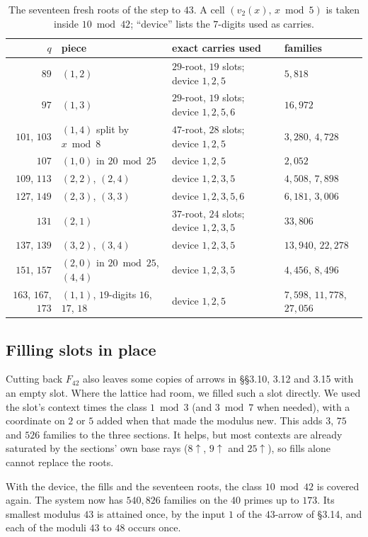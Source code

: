 \documentclass[11pt]{amsart}
\theoremstyle{definition}
\theoremstyle{remark}
\newcommand{\up}{{\uparrow}}
\begin{document}
\begin{table}[ht]
\centering
\caption{The seventeen fresh roots of the step to $43$. A cell $(v_2(x),\,x \bmod 5)$ is taken inside
$10 \bmod 42$; ``device'' lists the $7$-digits used as carries.}\label{tab:roots}
\small
\begin{tabular}{@{}rlll@{}}
\toprule
$q$ & piece & exact carries used & families\\
\midrule
$89$ & $(1,2)$ & $29$-root, $19$ slots; device $1,2,5$ & $5{,}818$\\
$97$ & $(1,3)$ & $29$-root, $19$ slots; device $1,2,5,6$ & $16{,}972$\\
$101$, $103$ & $(1,4)$ split by $x \bmod 8$ & $47$-root, $28$ slots; device $1,2,5$ & $3{,}280$, $4{,}728$\\
$107$ & $(1,0)$ in $20 \bmod 25$ & device $1,2,5$ & $2{,}052$\\
$109$, $113$ & $(2,2)$, $(2,4)$ & device $1,2,3,5$ & $4{,}508$, $7{,}898$\\
$127$, $149$ & $(2,3)$, $(3,3)$ & device $1,2,3,5,6$ & $6{,}181$, $3{,}006$\\
$131$ & $(2,1)$ & $37$-root, $24$ slots; device $1,2,3,5$ & $33{,}806$\\
$137$, $139$ & $(3,2)$, $(3,4)$ & device $1,2,3,5$ & $13{,}940$, $22{,}278$\\
$151$, $157$ & $(2,0)$ in $20 \bmod 25$, $(4,4)$ & device $1,2,3,5$ & $4{,}456$, $8{,}496$\\
$163$, $167$, $173$ & $(1,1)$, $19$-digits $16$, $17$, $18$ & device $1,2,5$ & $7{,}598$, $11{,}778$, $27{,}056$\\
\bottomrule
\end{tabular}
\end{table}

\subsection*{Filling slots in place}
Cutting back $F_{42}$ also leaves some copies of arrows in §§3.10, 3.12 and 3.15 with an empty slot. Where the lattice
had room, we filled such a slot directly. We used the slot's context times the class $1 \bmod 3$ (and $3 \bmod 7$ when
needed), with a coordinate on $2$ or $5$ added when that made the modulus new. This adds $3$, $75$ and $526$ families
to the three sections. It helps, but most contexts are already saturated by the sections' own base rays ($8\up$,
$9\up$ and $25\up$), so fills alone cannot replace the roots.

With the device, the fills and the seventeen roots, the class $10 \bmod 42$ is covered again. The system now has
$540{,}826$ families on the $40$ primes up to $173$. Its smallest modulus $43$ is attained once, by the input $1$ of
the $43$-arrow of §3.14, and each of the moduli $43$ to $48$ occurs once.
\end{document}
